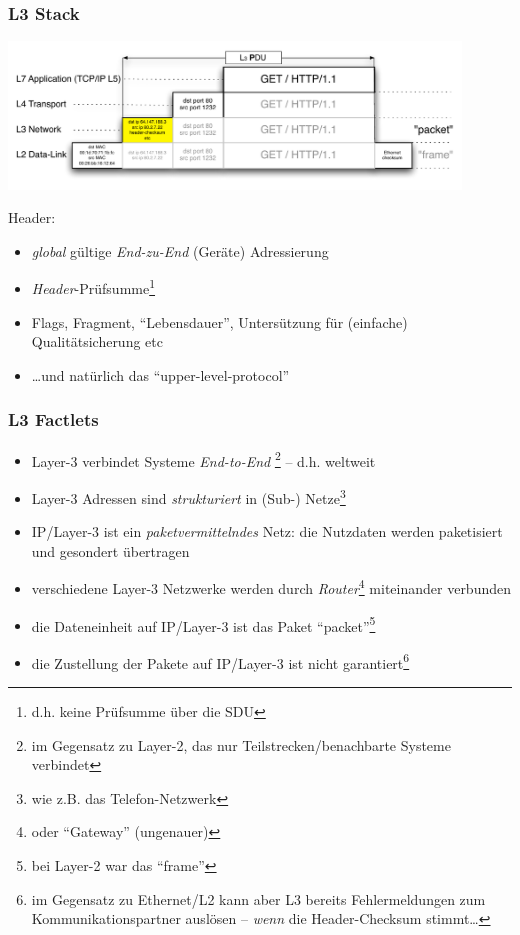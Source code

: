 \documentclass{beamer}
\begin{document}
\begin{frame}
\frametitle{L3 Stack}
\includegraphics[width=12cm]{stack-overview-3}

Header:
\begin{itemize}
  \item{\emph{global} g\"ultige \emph{End-zu-End} (Ger\"ate) Adressierung}
  \item{\emph{Header}-Pr\"ufsumme\footnote{d.h. keine Pr\"ufsumme \"uber die SDU}}
  \item{Flags, Fragment, ``Lebensdauer'', Unters\"utzung f\"ur (einfache) Qualit\"atsicherung etc}
  \item{\ldots und nat\"urlich das ``upper-level-protocol''}
\end{itemize}
\end{frame}


\begin{frame}
\frametitle{L3 Factlets}
\begin{itemize}
	\item{Layer-3 verbindet Systeme {\em End-to-End} \footnote{im Gegensatz zu Layer-2, das nur Teilstrecken/benachbarte Systeme verbindet} -- d.h. weltweit}
	\item{Layer-3 Adressen sind {\em strukturiert} in (Sub-) Netze\footnote{wie z.B. das Telefon-Netzwerk}}
	\item{IP/Layer-3 ist ein {\em paketvermittelndes} Netz: die Nutzdaten werden paketisiert und gesondert \"ubertragen}
	\item{verschiedene Layer-3 Netzwerke werden durch {\em Router}\footnote{oder ``Gateway'' (ungenauer)} miteinander verbunden}
	\item{die Dateneinheit auf IP/Layer-3 ist das Paket ``packet''\footnote{bei Layer-2 war das ``frame''}}
	\item{die Zustellung der Pakete auf IP/Layer-3 ist nicht garantiert\footnote{im Gegensatz zu Ethernet/L2 kann aber L3 bereits Fehlermeldungen zum Kommunikationspartner ausl\"osen -- \emph{wenn} die Header-Checksum stimmt\ldots}}
\end{itemize}
\end{frame}
\end{document}
